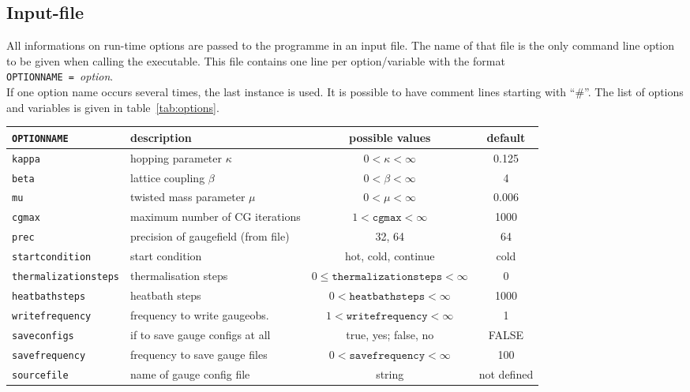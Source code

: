 \subsection{Input-file}
All informations on run-time options are passed to the programme in an input file. The name of that file is the only command line option to be given when calling the executable. This file contains one line per option/variable with the format\\
\verb+OPTIONNAME = +\textit{option}.\\
If one option name occurs several times, the last instance is used. It is possible to have comment lines starting with ``\#''.
The list of options and variables is given in table~\ref{tab:options}.

\begin{sidewaystable}
\begin{tabular}{llcc}
\verb+OPTIONNAME+ & description                        & possible values              & default \\
\hline
\verb+kappa+      & hopping parameter $\kappa$         & $0<\kappa<\infty$            & 0.125 \\
\verb+beta+       & lattice coupling $\beta$           & $0<\beta<\infty$             & 4 \\
\verb+mu+         & twisted mass parameter $\mu$       & $0<\mu<\infty$               & 0.006 \\
\verb+cgmax+      & maximum number of CG iterations    & $1<\texttt{cgmax}<\infty$    & 1000 \\
\verb+prec+       & precision of gaugefield (from file)& 32, 64                       & 64 \\
\verb+startcondition+ & start condition                & hot, cold, continue          & cold \\
\verb+thermalizationsteps+ & thermalisation steps      & $0\le\texttt{thermalizationsteps}<\infty$ & 0 \\
\verb+heatbathsteps+  & heatbath steps                 & $0<\texttt{heatbathsteps}<\infty$ & 1000 \\
\verb+writefrequency+  & frequency to write gaugeobs.  & $1<\texttt{writefrequency}<\infty$ & 1 \\
\verb+saveconfigs+  & if to save gauge configs at all  & true, yes; false, no & FALSE \\
\verb+savefrequency+  & frequency to save gauge files  & $0<\texttt{savefrequency}<\infty$ & 100 \\
\verb+sourcefile+  & name of gauge config file         & string                       &  not defined
\end{tabular}
\caption{List of all possible options and variables that can be passed to the programme in the input file.} \label{tab:options}
\end{sidewaystable}


